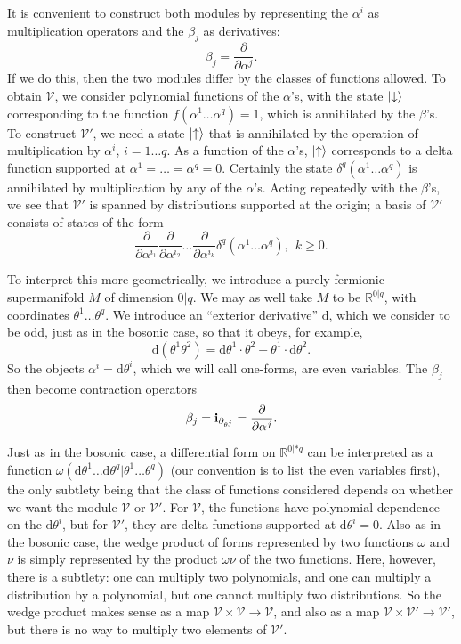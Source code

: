 \documentclass[11pt,a4paper]{article}
\def\V{{\mathcal V}}
\def\d{{\mathrm d}}
\def\R{{\mathbb R}}
\def\V{{\mathcal V}}
\def\i{{\mathbf i}}
\def\neg{\negthickspace}
\begin{document}
It is convenient to construct both modules by representing the $\alpha^i$ as multiplication operators and the $\beta_j$ as derivatives:
\begin{equation}\label{odolfo} \beta_j=\frac{\partial}{\partial \alpha^j}. \end{equation}
If we do this, then the two modules differ by the classes of functions allowed.  To obtain $\V$, we consider polynomial functions of the
$\alpha$'s, with the state $|\neg\downarrow\rangle$ corresponding to the function $f(\alpha^1\dots\alpha^q)=1$, which is annihilated by the $\beta$'s.
To construct $\V'$, we need a state $|\neg\uparrow\rangle$ that is annihilated by the operation of multiplication by $\alpha^i$, $i=1\dots q$.
As a function of the $\alpha$'s, $|\neg\uparrow\rangle$ corresponds to a delta function supported at $\alpha^1=\dots=\alpha^q=0$.  Certainly
the state $\delta^q(\alpha^1\dots\alpha^q)$ is annihilated by multiplication by any of the $\alpha$'s.  Acting repeatedly with the $\beta$'s, we
see that $\V'$ is spanned by distributions supported at the origin; a basis of $\V'$  consists of states of the form
\begin{equation}\label{nudolf}\frac{\partial}{\partial \alpha^{i_1}}\frac{\partial}{\partial \alpha^{i_2}}\dots\frac{\partial}{\partial \alpha^{i_k}}\delta^q(\alpha^1
\dots\alpha^q),~~k\geq 0.\end{equation}

To interpret this more geometrically, we introduce a purely fermionic supermanifold $M$ of dimension $0|q$.  We may as well take $M$ to
be $\R^{0|q}$, with coordinates $\theta^1\dots\theta^q$.  We introduce an ``exterior derivative'' $\d$,  which we consider to be odd, just as in the bosonic case, so that it obeys, for example, \begin{equation}\label{holes}
\d(\theta^1\theta^2)=\d\theta^1\cdot \theta^2
-\theta^1\cdot \d\theta^2.\end{equation}  So the objects $\alpha^i=\d \theta^i$, which we will call one-forms, are even variables.
  The $\beta_j$ then become 
contraction operators
\begin{equation}\label{thelc}\beta_j=\i_{{\tiny\partial}_{\theta^j}}=\frac{\partial}{\partial\alpha^j}.\end{equation}

Just as in the bosonic case, a differential form on $\R^{0|*q}$ can be interpreted as a function $\omega(\d\theta^1\dots\d\theta^q|\theta^1\dots
\theta^q)$ (our convention is to list the even  variables first), the only subtlety being that the class of functions considered depends on
whether we want the module $\V$ or $\V'$.  For $\V$, the functions have polynomial dependence on the $\d\theta^i$, but for $\V'$,
they are delta functions supported at $\d\theta^i=0$.  Also as in the bosonic case, the wedge product of forms
represented by two functions $\omega$ and $\nu$ is simply represented by the product $\omega\nu$ of the two functions.
Here, however, there is a subtlety: one can multiply two polynomials, and one can multiply a distribution by a polynomial, but one
cannot multiply two distributions.  So the wedge product makes sense as a map $\V\times \V\to\V$, and also as a map $\V\times \V'\to\V'$,
but there is no way to multiply two elements of $\V'$.
\end{document}

